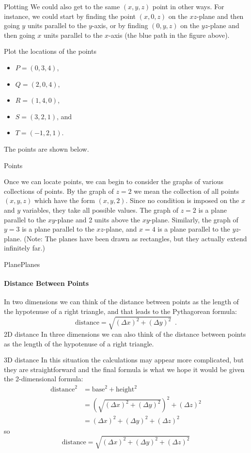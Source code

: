 Plotting
We could also get to the same $(x,y,z)$ point in other ways. For instance, we could start by finding the point $(x,0,z)$ on the $xz$-plane and then going $y$ units parallel to the $y$-axis, or by finding $(0,y,z)$ on the $yz$-plane and then going $x$ units parallel to the $x$-axis (the blue path in the figure above).

\begin{example}
Plot the locations of the points
\begin{itemize}
    \item $P=(0,3,4)$,
    \item $Q=(2,0,4)$,
    \item $R=(1,4,0)$,
    \item $S=(3,2,1)$, and
    \item $T=(-1,2,1)$.
\end{itemize}
\begin{solution} The points are shown below.

Points
\end{solution}\end{example}

Once we can locate points, we can begin to consider the graphs of various collections of points. By the graph of $z=2$ we mean the collection of all points $(x,y,z)$ which have the form $(x,y,2)$. Since no condition is imposed on the $x$ and $y$ variables, they take all possible values. The graph of $z=2$ is a plane parallel to the $xy$-plane and 2 units above the $xy$-plane. Similarly, the graph of $y=3$ is a plane parallel to the $xz$-plane, and $x=4$ is a plane parallel to the $yz$-plane. (Note: The planes have been drawn as rectangles, but they actually extend infinitely far.)

PlanePlanes
\paragraph*{Distance Between Points}
In two dimensions we can think of the distance between points as the length of the hypotenuse of a right triangle, and that leads to the Pythagorean formula:
$$\mbox{distance} = \sqrt{(\Delta x)^2 + (\Delta y)^2 } \enspace .$$
2D distance
In three dimensions we can also think of the distance between points as the length of the hypotenuse of a right triangle.

3D distance
In this situation the calculations may appear more complicated, but they are straightforward and the final formula is what we hope it would be given the 2-dimensional formula:
\begin{align*}
    \mbox{distance}^2   &= \mbox{base}^2 + \mbox{height}^2 \\
                        &= \left(\sqrt{(\Delta x)^2 + (\Delta y)^2}\right)^2 + (\Delta z)^2\\
                        &= (\Delta x)^2 + (\Delta y)^2 + (\Delta z)^2
\end{align*}
so
    $$\mbox{distance} = \sqrt{(\Delta x)^2 + (\Delta y)^2 + (\Delta z)^2}$$

